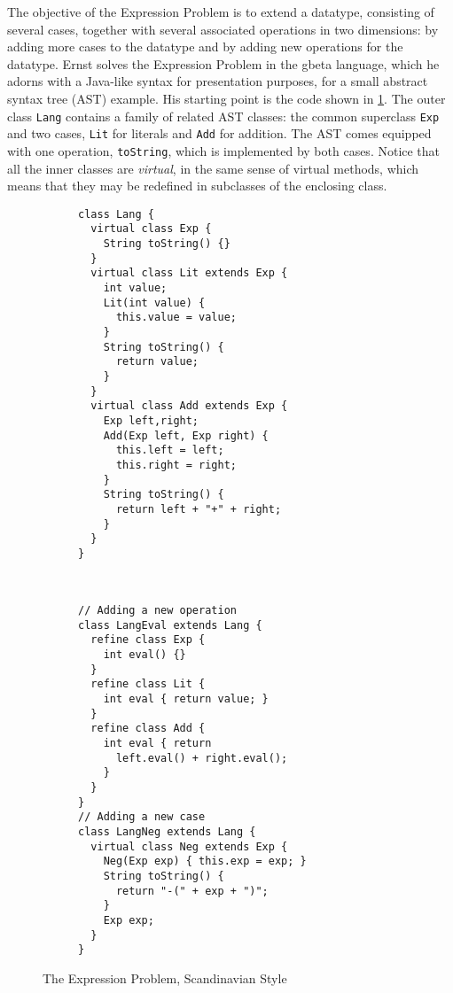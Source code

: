 The objective of the
Expression Problem is to extend a datatype, consisting of several cases,
together with several associated operations in two dimensions: by adding more
cases to the datatype and by adding new operations for the datatype. Ernst
solves the Expression Problem in the gbeta language, which he adorns with a
Java-like syntax for presentation purposes, for a small abstract syntax tree
(AST) example. His starting point is the code shown in \cref{fig:lang}. The
outer class \lstinline{Lang} contains a family of related AST classes: the
common superclass \lstinline{Exp} and two cases, \lstinline{Lit} for literals
and \lstinline{Add} for addition. The AST comes equipped with one operation,
\lstinline{toString}, which is implemented by both cases. Notice that all the
inner classes are \textit{virtual}, in the same sense of virtual methods, which
means that they may be redefined in subclasses of the enclosing class.


\begin{figure}[t]
    \centering
    \begin{subfigure}[b]{0.45\textwidth}
\begin{lstlisting}[language=gbeta]
class Lang {
  virtual class Exp {
    String toString() {}
  }
  virtual class Lit extends Exp {
    int value;
    Lit(int value) {
      this.value = value;
    }
    String toString() {
      return value;
    }
  }
  virtual class Add extends Exp {
    Exp left,right;
    Add(Exp left, Exp right) {
      this.left = left;
      this.right = right;
    }
    String toString() {
      return left + "+" + right;
    }
  }
}
\end{lstlisting}
 \label{fig:lang}
    \end{subfigure} ~
    \begin{subfigure}[b]{0.5\textwidth}
\begin{lstlisting}[language=gbeta,  xleftmargin=1mm]
// Adding a new operation
class LangEval extends Lang {
  refine class Exp {
    int eval() {}
  }
  refine class Lit {
    int eval { return value; }
  }
  refine class Add {
    int eval { return
      left.eval() + right.eval();
    }
  }
}
// Adding a new case
class LangNeg extends Lang {
  virtual class Neg extends Exp {
    Neg(Exp exp) { this.exp = exp; }
    String toString() {
      return "-(" + exp + ")";
    }
    Exp exp;
  }
}
\end{lstlisting}
 \label{fig:extend}
    \end{subfigure}
    \caption{The Expression Problem, Scandinavian Style}
\end{figure}

